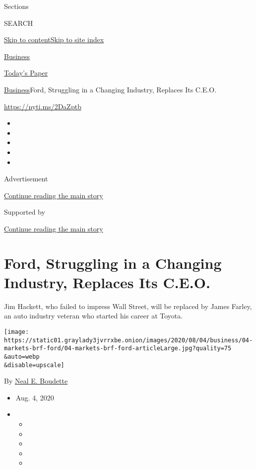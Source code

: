 Sections

SEARCH

\protect\hyperlink{site-content}{Skip to
content}\protect\hyperlink{site-index}{Skip to site index}

\href{https://www.nytimes3xbfgragh.onion/section/business}{Business}

\href{https://myaccount.nytimes3xbfgragh.onion/auth/login?response_type=cookie\&client_id=vi}{}

\href{https://www.nytimes3xbfgragh.onion/section/todayspaper}{Today's
Paper}

\href{/section/business}{Business}\textbar{}Ford, Struggling in a
Changing Industry, Replaces Its C.E.O.

\href{https://nyti.ms/2DaZptb}{https://nyti.ms/2DaZptb}

\begin{itemize}
\item
\item
\item
\item
\item
\end{itemize}

Advertisement

\protect\hyperlink{after-top}{Continue reading the main story}

Supported by

\protect\hyperlink{after-sponsor}{Continue reading the main story}

\hypertarget{ford-struggling-in-a-changing-industry-replaces-its-ceo}{%
\section{Ford, Struggling in a Changing Industry, Replaces Its
C.E.O.}\label{ford-struggling-in-a-changing-industry-replaces-its-ceo}}

Jim Hackett, who failed to impress Wall Street, will be replaced by
James Farley, an auto industry veteran who started his career at Toyota.

\texttt{[image: https://static01.graylady3jvrrxbe.onion/images/2020/08/04/business/04-markets-brf-ford/04-markets-brf-ford-articleLarge.jpg?quality=75\\\&auto=webp\\\&disable=upscale]}

By \href{https://www.nytimes3xbfgragh.onion/by/neal-e-boudette}{Neal E.
Boudette}

\begin{itemize}
\item
  Aug. 4, 2020
\item
  \begin{itemize}
  \item
  \item
  \item
  \item
  \item
  \end{itemize}
\end{itemize}

